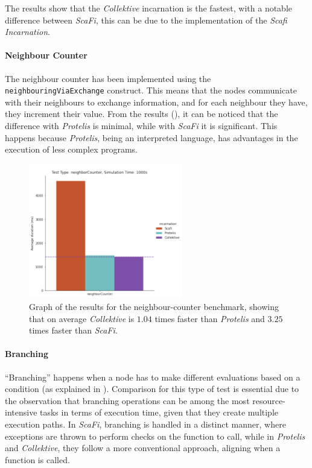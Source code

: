 The results show that the \emph{Collektive} incarnation is the fastest, with a notable difference between \emph{ScaFi},
this can be due to the implementation of the \emph{Scafi Incarnation}.

\paragraph{Neighbour Counter}
The neighbour counter has been implemented using the \texttt{neighbouringViaExchange} construct.
This means that the nodes communicate with their neighbours to exchange information, and for each neighbour they have, they
increment their value.
From the results (), it can be noticed that the difference with \emph{Protelis} is minimal,
while with \emph{ScaFi} it is significant.
This happens because \emph{Protelis}, being an interpreted language, has advantages in the execution of less complex programs.

\begin{figure}[ht!]
    \centering
    \includegraphics[width=0.6\textwidth]{figures/neighboring-results}
    \caption{Graph of the results for the neighbour-counter benchmark, showing that on average \emph{Collektive} is $1.04$ times faster
    than \emph{Protelis} and $3.25$ times faster than \emph{ScaFi}.}
    \label{fig:neghbour-counter}
\end{figure}

\paragraph{Branching}
``Branching'' happens when a node has to make different evaluations based on a condition (as explained in ).
Comparison for this type of test is essential due to the observation that branching operations can be among the most
resource-intensive tasks in terms of execution time, given that they create multiple execution paths.
In \emph{ScaFi}, branching is handled in a distinct manner, where exceptions are thrown to perform checks on the function to call,
while in \emph{Protelis} and \emph{Collektive}, they follow a more conventional approach, aligning when a function is called.

